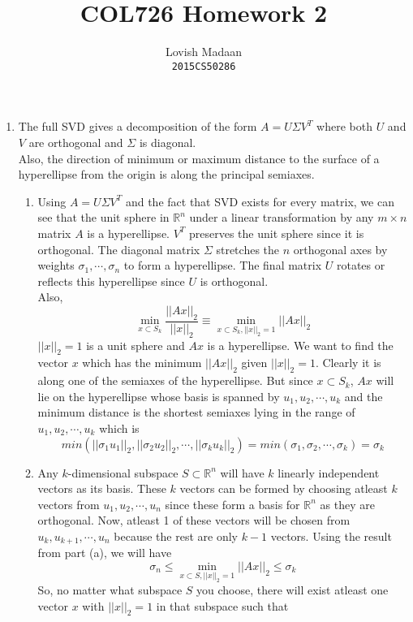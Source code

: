 \documentclass{article}
\title{COL726 Homework 2}
\author{Lovish Madaan \\ \texttt{2015CS50286}}
\date{}
\begin{document}
\maketitle

\begin{enumerate}
    \item The full SVD gives a decomposition of the form $A = U\Sigma V^T$ where both $U$ and $V$ are orthogonal and $\Sigma$ is diagonal.\\
    Also, the direction of minimum or maximum distance to the surface of a hyperellipse from the origin is along the principal semiaxes.
    \begin{enumerate}[label=(\alph*)]
        \item Using $A = U\Sigma V^T$ and the fact that SVD exists for every matrix, we can see that the unit sphere in $\mathbb{R}^n$ under a linear transformation by any $m \times n$ matrix $A$ is a hyperellipse. $V^T$ preserves the unit sphere since it is orthogonal. The diagonal matrix $\Sigma$ stretches the $n$ orthogonal axes by weights $\sigma_1, \cdots, \sigma_n$ to form a hyperellipse. The final matrix $U$ rotates or reflects this hyperellipse since $U$ is orthogonal.\\
        Also,
        $$\min_{x \subset S_k} \frac{||Ax||_2}{||x||_2} \equiv \min_{x \subset S_k, ||x||_2 = 1} ||Ax||_2$$
        $||x||_2 = 1$ is a unit sphere and $Ax$ is a hyperellipse. We want to find the vector $x$ which has the minimum $||Ax||_2$ given $||x||_2 = 1$. Clearly it is along one of the semiaxes of the hyperellipse. But since $x \subset S_k$, $Ax$ will lie on the hyperellipse whose basis is spanned by $u_1, u_2, \cdots, u_k$ and the minimum distance is the shortest semiaxes lying in the range of $u_1, u_2, \cdots, u_k$ which is
        $$min(||\sigma_1u_1||_2, ||\sigma_2u_2||_2, \cdots, ||\sigma_ku_k||_2) = min(\sigma_1, \sigma_2, \cdots, \sigma_k) = \sigma_k$$
        \item Any $k$-dimensional subspace $S \subset \mathbb{R}^n$ will have $k$ linearly independent vectors as its basis. These $k$ vectors can be formed by choosing atleast $k$ vectors from $u_1, u_2, \cdots, u_n$ since these form a basis for $\mathbb{R}^n$ as they are orthogonal. Now, atleast 1 of these vectors will be chosen from $u_k, u_{k + 1}, \cdots, u_n$ because the rest are only $k - 1$ vectors. Using the result from part (a), we will have
        $$\sigma_n \leq \min_{x \subset S, ||x||_2 = 1} ||Ax||_2 \leq \sigma_k$$
        So, no matter what subspace $S$ you choose, there will exist atleast one vector $x$ with $||x||_2 = 1$ in that subspace such that

\end{enumerate}
\end{enumerate}
\end{document}
